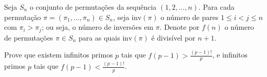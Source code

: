Seja \(S_n\) o conjunto de permutações da sequência \((1,2,\dots, n)\). Para cada permutação \(\pi=(\pi_1, \dots, \pi_n)\in S_n\), seja \(\mathrm{inv}(\pi)\) o número de pares \(1\le i < j \le n\) com \(\pi_i>\pi_j\); ou seja, o número de inversões em \(\pi\). Denote por \(f(n)\) o número de permutações \(\pi\in S_n\) para as quais \(\mathrm{inv}(\pi)\) é divisível por \(n+1\).

Prove que existem infinitos primos \(p\) tais que \(f(p-1)>\frac{(p-1)!}{p}\), e infinitos primos \(p\) tais que \(f(p-1)<\frac{(p-1)!}{p}\).
